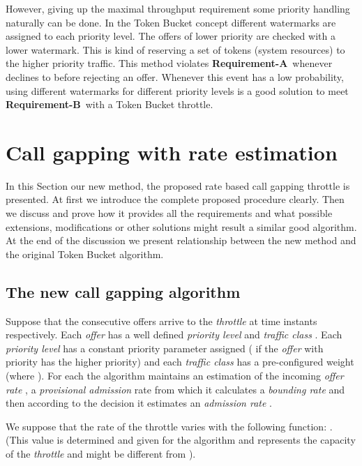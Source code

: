 \documentclass[conference]{IEEEtran}
\newcommand{\comment}[1]{}
\newcommand{\reqA}{\textbf{Requirement-A}}
\newcommand{\reqB}{\textbf{Requirement-B}}
\begin{document}
\comment{It is not so obvious problem if the capacity is described
with two parameters that cannot be compared i.e. Token Bucket with
.}

However, giving up the maximal throughput requirement some priority
handling naturally can be done. In the Token Bucket concept
different watermarks are assigned to each priority level. The offers
of lower priority are checked with a lower watermark. This is kind
of reserving a set of tokens (system resources) to the higher
priority traffic. This method violates \reqA\ whenever 
declines to  before rejecting an offer. Whenever this event has a
low probability, using different watermarks for different priority
levels is a good solution to meet \reqB\ with a Token Bucket
throttle.

\section{Call gapping with rate estimation}\label{section:new-call-gapping-mechanism} In this
Section our new method, the proposed rate based call gapping
throttle is presented. At first we introduce the complete proposed
procedure clearly. Then we discuss and prove how it provides all the
requirements and what possible extensions, modifications or other
solutions might result a similar good algorithm. At the end of the
discussion we present relationship between the new method and the
original Token Bucket algorithm.

\subsection{The new call gapping algorithm }
Suppose that the consecutive offers arrive to the \textit{throttle}
at  time instants respectively. Each
\textit{offer} has a well defined \textit{priority level}
 and \textit{traffic class} . Each
\textit{priority level}  has a constant priority parameter 
assigned ( if the \textit{offer} with priority  has
the higher priority) and each \textit{traffic class} has a
pre-configured weight 
(where ). For each  the algorithm maintains an
estimation of the incoming \textit{offer rate} , a
\textit{provisional admission} rate  from which
it calculates a \textit{bounding rate}  and then according
to the decision it estimates an \textit{admission rate}
.

We suppose that the rate of the throttle varies with the following
function: . (This value is determined and given for the
algorithm and represents the capacity of the \textit{throttle} and
might be different from ). \comment{We propose that the timer
 where  is an arbitrary constant that we will
explain later.}
\end{document}
